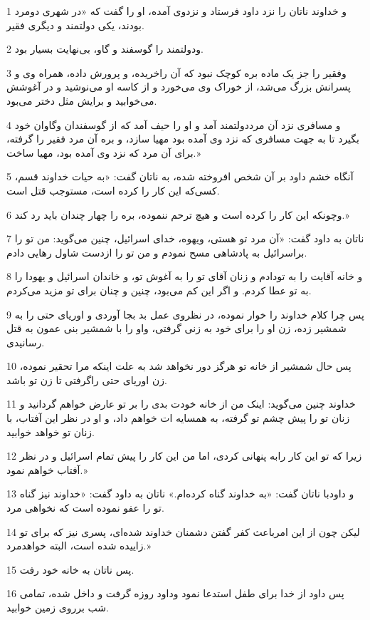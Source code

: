 \par 1 و خداوند ناتان را نزد داود فرستاد و نزدوی آمده، او را گفت که «در شهری دومرد بودند، یکی دولتمند و دیگری فقیر.
\par 2 ودولتمند را گوسفند و گاو، بی‌نهایت بسیار بود.
\par 3 وفقیر را جز یک ماده بره کوچک نبود که آن راخریده، و پرورش داده، همراه وی و پسرانش بزرگ می‌شد، از خوراک وی می‌خورد و از کاسه او می‌نوشید و در آغوشش می‌خوابید و برایش مثل دختر می‌بود.
\par 4 و مسافری نزد آن مرددولتمند آمد و او را حیف آمد که از گوسفندان وگاوان خود بگیرد تا به جهت مسافری که نزد وی آمده بود مهیا سازد، و بره آن مرد فقیر را گرفته، برای آن مرد که نزد وی آمده بود، مهیا ساخت.»
\par 5 آنگاه خشم داود بر آن شخص افروخته شده، به ناتان گفت: «به حیات خداوند قسم، کسی‌که این کار را کرده است، مستوجب قتل است.
\par 6 وچونکه این کار را کرده است و هیچ ترحم ننموده، بره را چهار چندان باید رد کند.»
\par 7 ناتان به داود گفت: «آن مرد تو هستی، ویهوه، خدای اسرائیل، چنین می‌گوید: من تو را براسرائیل به پادشاهی مسح نمودم و من تو را ازدست شاول رهایی دادم.
\par 8 و خانه آقایت را به تودادم و زنان آقای تو را به آغوش تو، و خاندان اسرائیل و یهودا را به تو عطا کردم. و اگر این کم می‌بود، چنین و چنان برای تو مزید می‌کردم.
\par 9 پس چرا کلام خداوند را خوار نموده، در نظروی عمل بد بجا آوردی و اوریای حتی را به شمشیر زده، زن او را برای خود به زنی گرفتی، واو را با شمشیر بنی عمون به قتل رسانیدی.
\par 10 پس حال شمشیر از خانه تو هرگز دور نخواهد شد به علت اینکه مرا تحقیر نموده، زن اوریای حتی راگرفتی تا زن تو باشد.
\par 11 خداوند چنین می‌گوید: اینک من از خانه خودت بدی را بر تو عارض خواهم گردانید و زنان تو را پیش چشم تو گرفته، به همسایه ات خواهم داد، و او در نظر این آفتاب، با زنان تو خواهد خوابید.
\par 12 زیرا که تو این کار رابه پنهانی کردی، اما من این کار را پیش تمام اسرائیل و در نظر آفتاب خواهم نمود.»
\par 13 و داودبا ناتان گفت: «به خداوند گناه کرده‌ام.» ناتان به داود گفت: «خداوند نیز گناه تو را عفو نموده است که نخواهی مرد.
\par 14 لیکن چون از این امرباعث کفر گفتن دشمنان خداوند شده‌ای، پسری نیز که برای تو زاییده شده است، البته خواهدمرد.»
\par 15 پس ناتان به خانه خود رفت.
\par 16 پس داود از خدا برای طفل استدعا نمود وداود روزه گرفت و داخل شده، تمامی شب برروی زمین خوابید.
